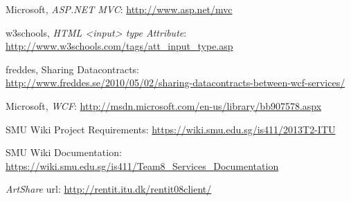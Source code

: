 \documentclass[../report.tex]{subfiles}
\begin{document}
\graphicspath{{img/}{../img/}}
\begingroup
\renewcommand{\chapter}[2]{}%
\begin{thebibliography}{}

Microsoft, \textit{ASP.NET MVC}: \url{http://www.asp.net/mvc} 

w3schools, \textit{HTML <input> type Attribute}: \\ \url{http://www.w3schools.com/tags/att\_input\_type.asp} 

freddes, Sharing Datacontracts: \\ \url{http://www.freddes.se/2010/05/02/sharing-datacontracts-between-wcf-services/}

Microsoft, \textit{WCF}: \url{http://msdn.microsoft.com/en-us/library/bb907578.aspx}

SMU Wiki Project Requirements: \url{https://wiki.smu.edu.sg/is411/2013T2-ITU}

SMU Wiki Documentation: \\ \url{https://wiki.smu.edu.sg/is411/Team8\_Services\_Documentation}

\textit{ArtShare} url: \url{http://rentit.itu.dk/rentit08client/}

\end{thebibliography}
\endgroup
\end{document}
